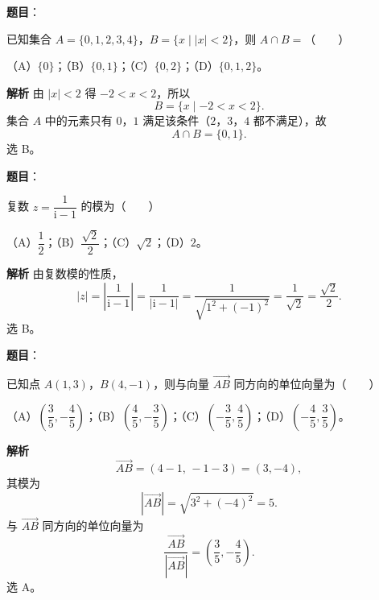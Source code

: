 
\begin{answer}

\textbf{题目}：

已知集合 $A=\{0,1,2,3,4\}$，$B=\{x\mid |x|<2\}$，则 $A\cap B=$\mbox{（　　）}

（A）$\{0\}$；（B）$\{0,1\}$；（C）$\{0,2\}$；（D）$\{0,1,2\}$。

\textbf{解析}
由 $|x|<2$ 得 $-2<x<2$，所以
\nopagebreak[4]
\[B=\{x\mid -2<x<2\}.\]
集合 $A$ 中的元素只有 $0$，$1$ 满足该条件（$2$，$3$，$4$ 都不满足），故
\nopagebreak[4]
\[A\cap B=\{0,1\}.\]
选 B。


\end{answer}
\begin{answer}

\textbf{题目}：

复数 $z=\dfrac{1}{\mathrm i-1}$ 的模为\mbox{（　　）}

（A）$\dfrac12$；（B）$\dfrac{\sqrt2}2$；（C）$\sqrt2$；（D）$2$。

\textbf{解析}
由复数模的性质，
\nopagebreak[4]
\[|z|=\left|\frac{1}{\mathrm i-1}\right|=\frac{1}{|\mathrm i-1|}=\frac{1}{\sqrt{1^2+(-1)^2}}=\frac1{\sqrt2}=\frac{\sqrt2}2.\]
选 B。


\end{answer}
\begin{answer}

\textbf{题目}：

已知点 $A(1,3)$，$B(4,-1)$，则与向量 $\overrightarrow{AB}$ 同方向的单位向量为\mbox{（　　）}

（A）$\left(\dfrac35,-\dfrac45\right)$；（B）$\left(\dfrac45,-\dfrac35\right)$；（C）$\left(-\dfrac35,\dfrac45\right)$；（D）$\left(-\dfrac45,\dfrac35\right)$。

\textbf{解析}
\nopagebreak[4]
\[\overrightarrow{AB}=(4-1,\,-1-3)=(3,-4),\]
其模为
\nopagebreak[4]
\[|\overrightarrow{AB}|=\sqrt{3^2+(-4)^2}=5.\]
与 $\overrightarrow{AB}$ 同方向的单位向量为
\nopagebreak[4]
\[\frac{\overrightarrow{AB}}{|\overrightarrow{AB}|}=\left(\frac35,-\frac45\right).\]
选 A。


\end{answer}
